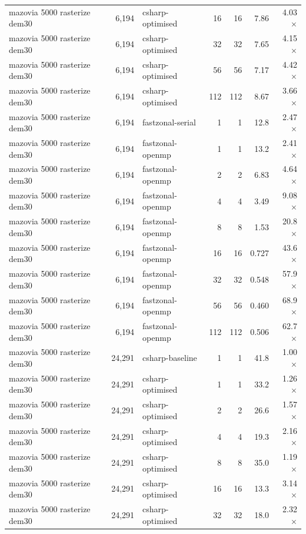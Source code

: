 \begin{tabular}{lrlrrrr}
mazovia 5000 rasterize dem30 & 6,194 & csharp-optimised & 16 & 16 & 7.86 & 4.03$\times$ \\
mazovia 5000 rasterize dem30 & 6,194 & csharp-optimised & 32 & 32 & 7.65 & 4.15$\times$ \\
mazovia 5000 rasterize dem30 & 6,194 & csharp-optimised & 56 & 56 & 7.17 & 4.42$\times$ \\
mazovia 5000 rasterize dem30 & 6,194 & csharp-optimised & 112 & 112 & 8.67 & 3.66$\times$ \\
mazovia 5000 rasterize dem30 & 6,194 & fastzonal-serial & 1 & 1 & 12.8 & 2.47$\times$ \\
mazovia 5000 rasterize dem30 & 6,194 & fastzonal-openmp & 1 & 1 & 13.2 & 2.41$\times$ \\
mazovia 5000 rasterize dem30 & 6,194 & fastzonal-openmp & 2 & 2 & 6.83 & 4.64$\times$ \\
mazovia 5000 rasterize dem30 & 6,194 & fastzonal-openmp & 4 & 4 & 3.49 & 9.08$\times$ \\
mazovia 5000 rasterize dem30 & 6,194 & fastzonal-openmp & 8 & 8 & 1.53 & 20.8$\times$ \\
mazovia 5000 rasterize dem30 & 6,194 & fastzonal-openmp & 16 & 16 & 0.727 & 43.6$\times$ \\
mazovia 5000 rasterize dem30 & 6,194 & fastzonal-openmp & 32 & 32 & 0.548 & 57.9$\times$ \\
mazovia 5000 rasterize dem30 & 6,194 & fastzonal-openmp & 56 & 56 & 0.460 & 68.9$\times$ \\
mazovia 5000 rasterize dem30 & 6,194 & fastzonal-openmp & 112 & 112 & 0.506 & 62.7$\times$ \\
mazovia 5000 rasterize dem30 & 24,291 & csharp-baseline & 1 & 1 & 41.8 & 1.00$\times$ \\
mazovia 5000 rasterize dem30 & 24,291 & csharp-optimised & 1 & 1 & 33.2 & 1.26$\times$ \\
mazovia 5000 rasterize dem30 & 24,291 & csharp-optimised & 2 & 2 & 26.6 & 1.57$\times$ \\
mazovia 5000 rasterize dem30 & 24,291 & csharp-optimised & 4 & 4 & 19.3 & 2.16$\times$ \\
mazovia 5000 rasterize dem30 & 24,291 & csharp-optimised & 8 & 8 & 35.0 & 1.19$\times$ \\
mazovia 5000 rasterize dem30 & 24,291 & csharp-optimised & 16 & 16 & 13.3 & 3.14$\times$ \\
mazovia 5000 rasterize dem30 & 24,291 & csharp-optimised & 32 & 32 & 18.0 & 2.32$\times$ \\

\end{tabular}
